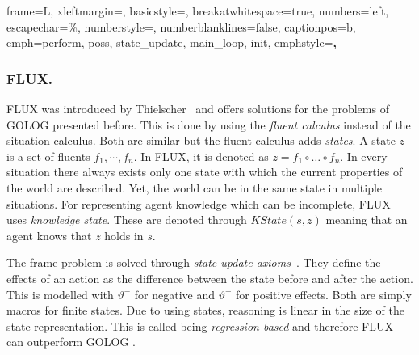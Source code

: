  {
  frame=L,
  xleftmargin=\parindent,
  basicstyle=\footnotesize\ttfamily,
  breakatwhitespace=true,
  numbers=left,
  escapechar=\%,
  numberstyle=\tiny,
  numberblanklines=false,
  captionpos=b,
  emph={perform, poss, state\_update, main\_loop, init},
  emphstyle=\textbf,
}
%
\lstset{style=flux} %
\subsubsection{FLUX.}\label{fun:apl_flux}
FLUX was introduced by Thielscher~\cite{thielscher_flux:_2005} and offers solutions for the problems of GOLOG presented before. This is done by using the \emph{fluent calculus} instead of the situation calculus. Both are similar but the fluent calculus adds \emph{states}. A state $z$ is a set of fluents $f_1,\cdots,f_n$. In FLUX, it is denoted as $z = f_1 \circ \ldots \circ f_n$. In every situation there always exists only one state with which the current properties of the world are described. Yet, the world can be in the same state in multiple situations. For representing agent knowledge which can be incomplete, FLUX uses \emph{knowledge state}. These are denoted through $\textit{KState}(s,z)$ meaning that an agent knows that $z$ holds in $s$.

The frame problem is solved through \emph{state update axioms}~\cite{thielscher_situation_1999}. They define the effects of an action as the difference between the state before and after the action. This is modelled with $\vartheta^-$ for negative and $\vartheta^+$ for positive effects. Both are simply macros for finite states. Due to using states, reasoning is linear in the size of the state representation. This is called being \emph{regression-based} and therefore FLUX can outperform GOLOG \cite{thielscher_flux:_2005}.


